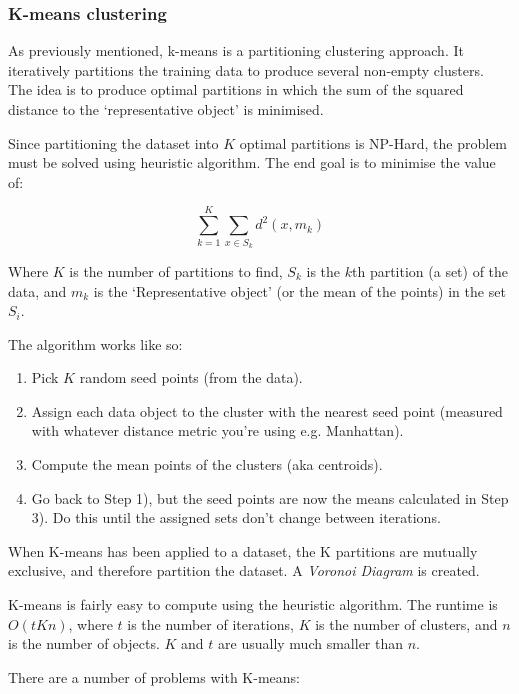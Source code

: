 \subsubsection{K-means clustering}

As previously mentioned, k-means is a partitioning clustering approach. It
iteratively partitions the training data to produce several non-empty clusters.
The idea is to produce optimal partitions in which the sum of the squared
distance to the `representative object' is minimised.

Since partitioning the dataset into $K$ optimal partitions is NP-Hard, the
problem must be solved using heuristic algorithm. The end goal is to minimise
the value of:

\[
  \sum\limits_{k=1}^K\sum\limits_{x \in S_k}d^2(x, m_k)
\]

Where $K$ is the number of partitions to find, $S_k$ is the $k$th partition (a
set) of the data, and $m_k$ is the `Representative object' (or the mean of the
points) in the set $S_i$.

The algorithm works like so:

\begin{enumerate}
  \item Pick $K$ random seed points (from the data).
  \item Assign each data object to the cluster with the nearest seed point
    (measured with whatever distance metric you're using e.g. Manhattan).
  \item Compute the mean points of the clusters (aka centroids).
  \item Go back to Step 1), but the seed points are now the means calculated in
    Step 3). Do this until the assigned sets don't change between iterations.
\end{enumerate}



When K-means has been applied to a dataset, the K partitions are mutually
exclusive, and therefore partition the dataset. A \textit{Voronoi Diagram} is
created.

K-means is fairly easy to compute using the heuristic algorithm. The runtime is
$O(tKn)$, where $t$ is the number of iterations, $K$ is the number of clusters,
and $n$ is the number of objects. $K$ and $t$ are usually much smaller than $n$.

There are a number of problems with K-means:

